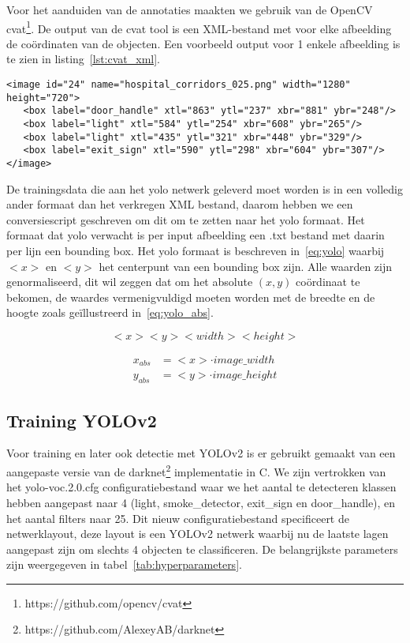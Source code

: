 Voor het aanduiden van de annotaties maakten we gebruik van de OpenCV \gls{cvat}\footnote{https://github.com/opencv/cvat}.
De output van de \gls{cvat} tool is een XML-bestand met voor elke afbeelding de co\"{o}rdinaten van de objecten. Een voorbeeld output voor 1 enkele afbeelding is te zien in listing~\ref{lst:cvat_xml}.

   \begin{lstlisting}[basicstyle=\small]
<image id="24" name="hospital_corridors_025.png" width="1280" height="720">
   <box label="door_handle" xtl="863" ytl="237" xbr="881" ybr="248"/>
   <box label="light" xtl="584" ytl="254" xbr="608" ybr="265"/>
   <box label="light" xtl="435" ytl="321" xbr="448" ybr="329"/>
   <box label="exit_sign" xtl="590" ytl="298" xbr="604" ybr="307"/>
</image>
   \end{lstlisting}

De trainingsdata die aan het \gls{yolo} netwerk geleverd moet worden is in een volledig ander formaat dan het verkregen XML bestand, daarom hebben we een conversiescript geschreven om dit om te zetten naar het \gls{yolo} formaat.
Het formaat dat \gls{yolo} verwacht is per input afbeelding een .txt bestand met daarin per lijn een bounding box. Het \gls{yolo} formaat is beschreven in~\ref{eq:yolo} waarbij $<x>$ en $<y>$ het centerpunt van een bounding box zijn.
Alle waarden zijn genormaliseerd, dit wil zeggen dat om het absolute $(x, y)$ co\"{o}rdinaat te bekomen, de waardes vermenigvuldigd moeten worden met de breedte en de hoogte zoals ge\"{i}llustreerd in~\ref{eq:yolo_abs}.

\begin{equation} \label{eq:yolo}
  <x> <y> <width> <height>
\end{equation}

\begin{equation} \label{eq:yolo_abs}
    \begin{split}
        x_{abs} &= <x> \cdot  image\_width \\
        y_{abs} &= <y> \cdot image\_height
    \end{split}
\end{equation}


\subsection{Training YOLOv2}

Voor training en later ook detectie met YOLOv2 is er gebruikt gemaakt van een aangepaste versie van de darknet\footnote{https://github.com/AlexeyAB/darknet} implementatie in C.
We zijn vertrokken van het yolo-voc.2.0.cfg configuratiebestand waar we het aantal te detecteren klassen hebben aangepast naar 4 (light, smoke\_detector, exit\_sign en door\_handle), en het aantal filters naar 25.
Dit nieuw configuratiebestand specificeert de netwerklayout, deze layout is een YOLOv2 netwerk waarbij nu de laatste lagen aangepast zijn om slechts 4 objecten te classificeren.
De belangrijkste parameters zijn weergegeven in tabel~\ref{tab:hyperparameters}.

